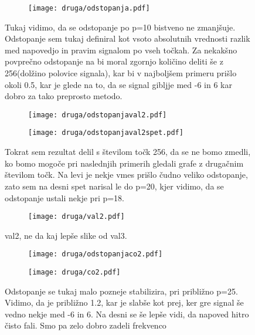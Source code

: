 \documentclass{article}
\begin{document}
\begin{figure}[H]
\centering
\begin{subfigure}{.75\textwidth}
\texttt{[image: druga/odstopanja.pdf]}
\end{subfigure}
\caption*{Tukaj vidimo, da se odstopanje po p=10 bistveno ne zmanjšuje. Odstopanje sem tukaj definiral kot vsoto absolutnih vrednosti razlik med napovedjo in pravim signalom po vseh točkah. Za nekakšno povprečno odstopanje na bi moral zgornjo količino deliti še z 256(dolžino polovice signala), kar bi v najboljšem primeru prišlo okoli 0.5, kar je glede na to, da se signal gibljje med -6 in 6 kar dobro za tako preprosto metodo.}
\end{figure}

\begin{figure}[H]
\centering
\begin{subfigure}{.49\textwidth}
\texttt{[image: druga/odstopanjaval2.pdf]}
\end{subfigure}
\begin{subfigure}{.49\textwidth}
\texttt{[image: druga/odstopanjaval2spet.pdf]}
\end{subfigure}
\caption*{Tokrat sem rezultat delil s številom točk 256, da se ne bomo zmedli, ko bomo mogoče pri naslednjih primerih gledali grafe z drugačnim številom točk. Na levi je nekje vmes prišlo čudno veliko odstopanje, zato sem na desni spet narisal le do p=20, kjer vidimo, da se odstopanje ustali nekje pri p=18.}
\end{figure}

\begin{figure}[H]
\centering
\begin{subfigure}{.75\textwidth}
\texttt{[image: druga/val2.pdf]}
\end{subfigure}
\caption*{val2, ne da kaj lepše slike od val3.}
\end{figure}

\begin{figure}[H]
\centering
\begin{subfigure}{.49\textwidth}
\texttt{[image: druga/odstopanjaco2.pdf]}
\end{subfigure}
\begin{subfigure}{.49\textwidth}
\texttt{[image: druga/co2.pdf]}
\end{subfigure}
\caption*{Odstopanje se tukaj malo pozneje stabilizira, pri približno p=25. Vidimo, da je približno 1.2, kar je slabše kot prej, ker gre signal še vedno nekje med -6 in 6. Na desni se še lepše vidi, da napoved hitro čisto fali. Smo pa zelo dobro zadeli frekvenco}
\end{figure}
\end{document}
